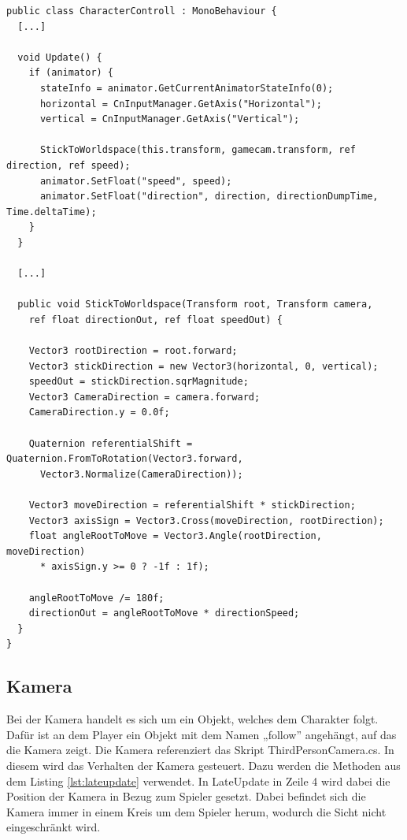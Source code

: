 \begin{scriptsize}
\lstset{
	float,
	caption=Skript: CharacterControll.cs, 
	language=[Sharp]C, 
	frame=single,  
	showstringspaces=false, 
	showspaces=false, 
	numbers=left, 
	captionpos=b, 
	belowcaptionskip=4pt,
	basicstyle=\ttfamily
} 
\begin{lstlisting}[label=lst:charactercontroller]
public class CharacterControll : MonoBehaviour {
  [...]	
	
  void Update() {  
    if (animator) {
      stateInfo = animator.GetCurrentAnimatorStateInfo(0);
      horizontal = CnInputManager.GetAxis("Horizontal");
      vertical = CnInputManager.GetAxis("Vertical");
      
      StickToWorldspace(this.transform, gamecam.transform, ref direction, ref speed);
      animator.SetFloat("speed", speed);
      animator.SetFloat("direction", direction, directionDumpTime, Time.deltaTime);
    }
  }
    
  [...]

  public void StickToWorldspace(Transform root, Transform camera, 
    ref float directionOut, ref float speedOut) {
    
    Vector3 rootDirection = root.forward;
    Vector3 stickDirection = new Vector3(horizontal, 0, vertical);
    speedOut = stickDirection.sqrMagnitude;
    Vector3 CameraDirection = camera.forward;
    CameraDirection.y = 0.0f;
    
    Quaternion referentialShift = Quaternion.FromToRotation(Vector3.forward, 
      Vector3.Normalize(CameraDirection));
        	
    Vector3 moveDirection = referentialShift * stickDirection;
    Vector3 axisSign = Vector3.Cross(moveDirection, rootDirection);
    float angleRootToMove = Vector3.Angle(rootDirection, moveDirection) 
      * axisSign.y >= 0 ? -1f : 1f);      
        	
    angleRootToMove /= 180f;
    directionOut = angleRootToMove * directionSpeed;
  }
}
\end{lstlisting}
\end{scriptsize}

		\subsection{Kamera}
			Bei der Kamera handelt es sich um ein Objekt, welches dem Charakter folgt. Dafür ist an dem Player ein Objekt mit dem Namen „follow” angehängt, auf das die Kamera zeigt. Die Kamera referenziert das Skript ThirdPersonCamera.cs. In diesem wird das Verhalten der Kamera gesteuert. Dazu werden die Methoden aus dem Listing \ref{lst:lateupdate} verwendet. In LateUpdate in Zeile 4 wird dabei die Position der Kamera in Bezug zum Spieler gesetzt. Dabei befindet sich die Kamera immer in einem Kreis um dem Spieler herum, wodurch die Sicht nicht eingeschränkt wird.

